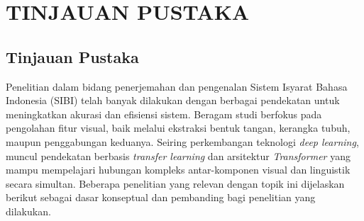 \newpage
\chapter{TINJAUAN PUSTAKA} \label{Bab II}

\section{Tinjauan Pustaka} \label{II.Tinjauan}
Penelitian dalam bidang penerjemahan dan pengenalan Sistem Isyarat Bahasa Indonesia (SIBI) telah banyak dilakukan dengan berbagai pendekatan untuk meningkatkan akurasi dan efisiensi sistem. Beragam studi berfokus pada pengolahan fitur visual, baik melalui ekstraksi bentuk tangan, kerangka tubuh, maupun penggabungan keduanya. Seiring perkembangan teknologi \textit{deep learning}, muncul pendekatan berbasis \textit{transfer learning} dan arsitektur \textit{Transformer} yang mampu mempelajari hubungan kompleks antar-komponen visual dan linguistik secara simultan. Beberapa penelitian yang relevan dengan topik ini dijelaskan berikut sebagai dasar konseptual dan pembanding bagi penelitian yang dilakukan. \par


